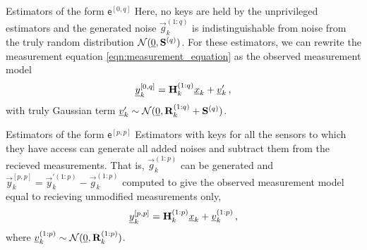 \documentclass[conference]{IEEEtran}
\theoremstyle{definition}
\theoremstyle{remark}
\begin{document}
\begin{LaTeXdescription}
  \item[Estimators of the form $\mathsf{e}^{[0,q]}$] Here, no keys are held by the unprivileged estimators and the generated noise $\vec{g}_k^{(1:q)}$ is indistinguishable from noise from the truly random distribution $\mathcal{N}({\underline{0}}, {{\mathbf{S}}}^{(q)})$. For these estimators, we can rewrite the measurement equation \eqref{eqn:measurement_equation} as the observed measurement model
  \begin{equation}\label{eqn:0q_obs_measurement_model}
    \vec{y}_k^{[0,q]} = \mat{H}_k^{(1:q)}\vec{x}_k + \vec{v}_k^{\prime}\,,
  \end{equation}
  with truly Gaussian term ${\underline{v}}_k^{\prime} \sim \mathcal{N}({\underline{0}}, {{\mathbf{R}}}_k^{(1:q)}+{{\mathbf{S}}}^{(q)})$.
  
  \item[Estimators of the form $\mathsf{e}^{[p,p]}$] Estimators with keys for all the sensors to which they have access can generate all added noises and subtract them from the recieved measurements. That is, $\vec{g}_k^{(1:p)}$ can be generated and $\vec{y}_k^{[p,p]}=\vec{y}_k^{\prime(1:p)}-\vec{g}_k^{(1:p)}$ computed to give the observed measurement model equal to recieving unmodified measurements only,
  \begin{equation}\label{eqn:pp_obs_measurement_model}
    \vec{y}_k^{[p,p]} = \mat{H}_k^{(1:p)}\vec{x}_k + \vec{v}_k^{(1:p)}\,,
  \end{equation}
  where ${\underline{v}}_k^{(1:p)} \sim \mathcal{N}({\underline{0}}, {{\mathbf{R}}}_k^{(1:p)})$.


\end{LaTeXdescription}
\end{document}
